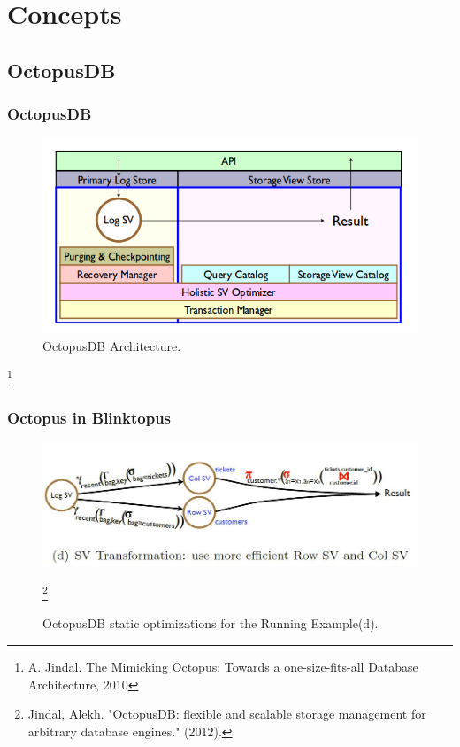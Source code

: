 \documentclass{beamer}
\begin{document}
\section{Concepts}
\subsection{OctopusDB}
\begin{frame}
\frametitle{OctopusDB}
\begin{figure}
\includegraphics[scale=0.4]{img/octopus_arch.png}
\caption{OctopusDB Architecture.}
\end{figure}
\footnote{A. Jindal. The Mimicking Octopus: Towards a one-size-fits-all Database Architecture, 2010}
\end{frame}

\begin{frame}
\frametitle{Octopus in Blinktopus}
\begin{figure}
\includegraphics[scale=0.4]{img/SV_transformation.JPG}
\caption{OctopusDB static optimizations for the Running Example(d).}
\footnote{Jindal, Alekh. "OctopusDB: flexible and scalable storage management for arbitrary database engines." (2012).}
\end{figure}
\end{frame}
\end{document}
